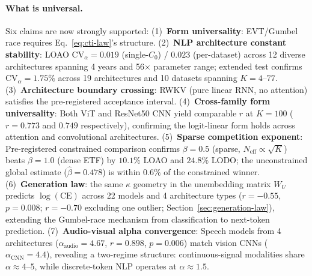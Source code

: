 \documentclass{article}
\begin{document}
\paragraph{What is universal.}
Six claims are now strongly supported:
(1)~\textbf{Form universality}: EVT/Gumbel race requires Eq.~\ref{eq:cti-law}'s structure.
(2)~\textbf{NLP architecture constant stability}: LOAO $\mathrm{CV}_\alpha=0.019$ (single-$C_0$) / $0.023$ (per-dataset) across 12 diverse architectures spanning 4 years and 56$\times$ parameter range; extended test confirms $\mathrm{CV}_\alpha=1.75\%$ across 19 architectures and 10 datasets spanning $K=4$--$77$.
(3)~\textbf{Architecture boundary crossing}: RWKV (pure linear RNN, no attention) satisfies the pre-registered acceptance interval.
(4)~\textbf{Cross-family form universality}: Both ViT and ResNet50 CNN yield comparable $r$ at $K=100$ ($r=0.773$ and $0.749$ respectively), confirming the logit-linear form holds across attention and convolutional architectures.
(5)~\textbf{Sparse competition exponent}: Pre-registered constrained comparison confirms $\beta=0.5$
(sparse, $N_\mathrm{eff}\propto\sqrt{K}$) beats $\beta=1.0$ (dense ETF) by $10.1\%$ LOAO and $24.8\%$
LODO; the unconstrained global estimate ($\hat\beta=0.478$) is within $0.6\%$ of the constrained winner.
(6)~\textbf{Generation law}: the same $\kappa$ geometry in the unembedding matrix $W_U$ predicts $\log(\mathrm{CE})$ across 22 models and 4 architecture types ($r=-0.55$, $p=0.008$; $r=-0.70$ excluding one outlier; Section~\ref{sec:generation-law}), extending the Gumbel-race mechanism from classification to next-token prediction.
(7)~\textbf{Audio-visual alpha convergence}: Speech models from 4 architectures ($\alpha_\mathrm{audio}=4.67$, $r=0.898$, $p=0.006$) match vision CNNs ($\alpha_\mathrm{CNN}=4.4$), revealing a two-regime structure: continuous-signal modalities share $\alpha\approx4$--$5$, while discrete-token NLP operates at $\alpha\approx1.5$.
\end{document}
